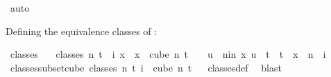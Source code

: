\begin{isabellebody}
\ auto\isanewline
{}\isamarkupfalse%
%
\endisatagproof
{\isafoldproof}%
%
\isadelimproof
%
\endisadelimproof
%
\isadelimdocument
%
\endisadelimdocument
%
\isatagdocument
%
\isamarkuptrue%
%
\endisatagdocument
{\isafolddocument}%
%
\isadelimdocument
%
\endisadelimdocument
%
\begin{isamarkuptext}%
Defining the equivalence classes of : %
\end{isamarkuptext}\isamarkuptrue%
\isamarkupfalse%
\ classes\isanewline
\ \ \ {\isachardoublequoteopen}classes\ n\ t\ {\isasymequiv}\ {\isacharparenleft}{\kern0pt}{\isasymlambda}i{\isachardot}{\kern0pt}\ {\isacharbraceleft}{\kern0pt}x\ {\isachardot}{\kern0pt}\ x\ {\isasymin}\ {\isacharparenleft}{\kern0pt}cube\ n\ {\isacharparenleft}{\kern0pt}t\ {\isacharplus}{\kern0pt}\ {}{\isacharparenright}{\kern0pt}{\isacharparenright}{\kern0pt}\ {\isasymand}\ {\isacharparenleft}{\kern0pt}{\isasymforall}u\ {\isasymin}\ {\isacharbraceleft}{\kern0pt}{\isacharparenleft}{\kern0pt}n{\isacharminus}{\kern0pt}i{\isacharparenright}{\kern0pt}{\isachardot}{\kern0pt}{\isachardot}{\kern0pt}{\isacharless}{\kern0pt}n{\isacharbraceright}{\kern0pt}{\isachardot}{\kern0pt}\ x\ u\ {\isacharequal}{\kern0pt}\ t{\isacharparenright}{\kern0pt}\ {\isasymand}\ t\ {\isasymnotin}\ x\ {\isacharbackquote}{\kern0pt}\ {\isacharbraceleft}{\kern0pt}{\isachardot}{\kern0pt}{\isachardot}{\kern0pt}{\isacharless}{\kern0pt}{\isacharparenleft}{\kern0pt}n\ {\isacharminus}{\kern0pt}\ i{\isacharparenright}{\kern0pt}{\isacharbraceright}{\kern0pt}{\isacharbraceright}{\kern0pt}{\isacharparenright}{\kern0pt}{\isachardoublequoteclose}\isanewline
\isanewline
{}\isamarkupfalse%
\ classes{\isacharunderscore}{\kern0pt}subset{\isacharunderscore}{\kern0pt}cube{\isacharcolon}{\kern0pt}\ {\isachardoublequoteopen}classes\ n\ t\ i\ {\isasymsubseteq}\ cube\ n\ {\isacharparenleft}{\kern0pt}t{\isacharplus}{\kern0pt}{}{\isacharparenright}{\kern0pt}{\isachardoublequoteclose}%
\isadelimproof
\ %
\endisadelimproof
%
\isatagproof
{}\isamarkupfalse%
\ classes{\isacharunderscore}{\kern0pt}def\ \isamarkupfalse%
\ blast%
\endisatagproof
{\isafoldproof}%
%
\isadelimproof

\end{isabellebody}
